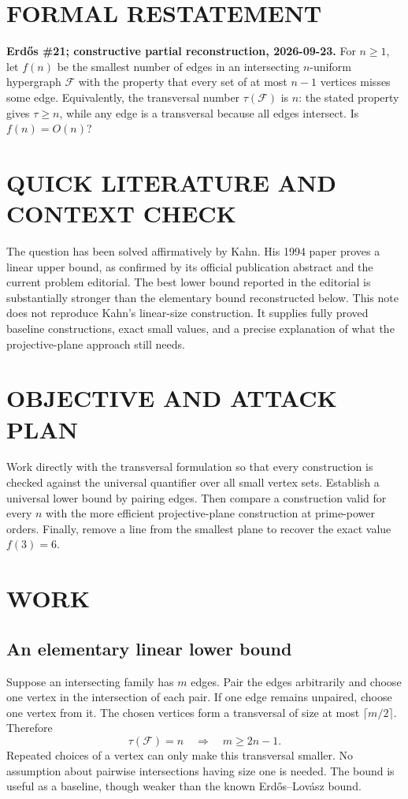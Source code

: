 \section{FORMAL RESTATEMENT}
\textbf{Erd\H{o}s \#21; constructive partial reconstruction, 2026-09-23.}
For $n\ge1$, let $f(n)$ be the smallest number of edges in an intersecting $n$-uniform hypergraph $\mathcal F$ with the property that every set of at most $n-1$ vertices misses some edge. Equivalently, the transversal number $\tau(\mathcal F)$ is $n$: the stated property gives $\tau\ge n$, while any edge is a transversal because all edges intersect. Is $f(n)=O(n)$?

\section{QUICK LITERATURE AND CONTEXT CHECK}
The question has been solved affirmatively by Kahn. His 1994 paper proves a linear upper bound, as confirmed by its official publication abstract and the current problem editorial. The best lower bound reported in the editorial is substantially stronger than the elementary bound reconstructed below. This note does not reproduce Kahn's linear-size construction. It supplies fully proved baseline constructions, exact small values, and a precise explanation of what the projective-plane approach still needs.

\section{OBJECTIVE AND ATTACK PLAN}
Work directly with the transversal formulation so that every construction is checked against the universal quantifier over all small vertex sets. Establish a universal lower bound by pairing edges. Then compare a construction valid for every $n$ with the more efficient projective-plane construction at prime-power orders. Finally, remove a line from the smallest plane to recover the exact value $f(3)=6$.

\section{WORK}
\subsection{An elementary linear lower bound}
Suppose an intersecting family has $m$ edges. Pair the edges arbitrarily and choose one vertex in the intersection of each pair. If one edge remains unpaired, choose one vertex from it. The chosen vertices form a transversal of size at most $\lceil m/2\rceil$. Therefore
\[
 \tau(\mathcal F)=n\quad\Longrightarrow\quad m\ge2n-1.
\tag{1}
\]
Repeated choices of a vertex can only make this transversal smaller. No assumption about pairwise intersections having size one is needed. The bound is useful as a baseline, though weaker than the known Erd\H{o}s--Lov\'asz bound.


